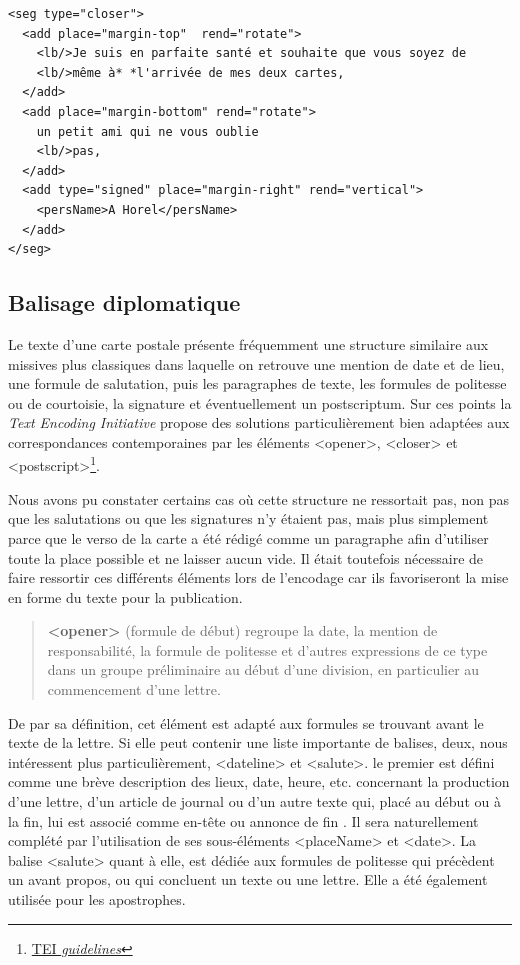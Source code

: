 \documentclass[12pt,a4paper]{book} %
\begin{document}
\begin{lstlisting}
<seg type="closer">
  <add place="margin-top"  rend="rotate">                  
    <lb/>Je suis en parfaite santé et souhaite que vous soyez de                                     
    <lb/>même à* *l'arrivée de mes deux cartes,
  </add>
  <add place="margin-bottom" rend="rotate">
    un petit ami qui ne vous oublie                  
    <lb/>pas,
  </add>  
  <add type="signed" place="margin-right" rend="vertical">               
    <persName>A Horel</persName>                  
  </add>
</seg>
\end{lstlisting}
\bigskip

\subsection{Balisage diplomatique}

Le texte d'une carte postale présente fréquemment une structure similaire aux missives plus classiques dans laquelle on retrouve une mention de date et de lieu, une formule de salutation, puis les paragraphes de texte, les formules de politesse ou de courtoisie, la signature et éventuellement un postscriptum.
Sur ces points la \textit{Text Encoding Initiative} propose des solutions particulièrement bien adaptées aux correspondances contemporaines par les éléments <opener>, <closer> et <postscript>\footnote{\href{http://www.tei-c.org/release/doc/tei-p5-doc/fr/html/DS.html\#DSOC}{TEI \textit{guidelines}}}.

Nous avons pu constater certains cas où cette structure ne ressortait pas, non pas que les salutations ou que les signatures n'y étaient pas, mais plus simplement parce que le verso de la carte a été rédigé comme un paragraphe afin d'utiliser toute la place possible et ne laisser aucun vide. Il était toutefois nécessaire de faire ressortir ces différents éléments lors de l'encodage car ils favoriseront la mise en forme du texte pour la publication.

\begin{quotation}
\textbf{<opener>} (formule de début) regroupe la date, la mention de responsabilité, la formule de politesse et d'autres expressions de ce type dans un groupe préliminaire au début d’une division, en particulier au commencement d'une lettre.
\end{quotation}   

De par sa définition, cet élément est  adapté aux formules se trouvant avant le texte de la lettre. Si elle peut contenir une liste importante de balises, deux, nous intéressent plus particulièrement, <dateline> et <salute>.
le premier est défini comme \og [contenant] une brève description des lieux, date, heure, etc. concernant la production d'une lettre, d'un article de journal ou d'un autre texte qui, placé au début ou à la fin, lui est associé comme en-tête ou annonce de fin \fg{}. Il sera naturellement complété par l'utilisation de ses sous-éléments <placeName> et <date>. La balise <salute> quant à elle, est dédiée aux formules de politesse qui précèdent un avant propos, ou qui concluent un texte ou une lettre. Elle a été également utilisée pour les apostrophes.
\bigskip
\end{document}
